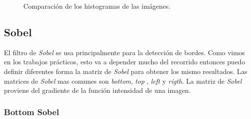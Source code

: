 \begin{figure}[H]
	\centering
	\caption{Comparación de los histogramas de las imágenes.}
\end{figure}	

\subsection{Sobel}

El filtro de \textit{Sobel} se usa principalmente para la detección de bordes. Como vimos en los trabajos prácticos, esto va a depender mucho del recorrido entonces puedo definir diferentes forma la matriz de \textit{Sobel} para obtener los mismo resultados. Las matrices de \textit{Sobel} mas comunes son \textit{bottom}, \textit{top} , \textit{left} y \textit{rigth}. La matriz de \textit{Sobel} proviene del gradiente de la función intensidad de una imagen.

\subsubsection{Bottom Sobel}

